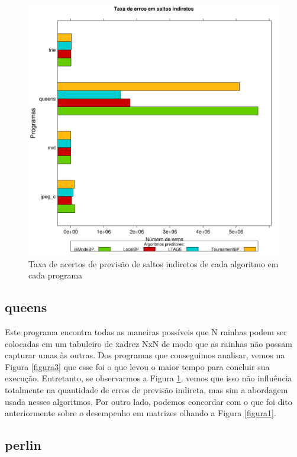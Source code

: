 \documentclass[12pt]{article}
\begin{document}
\begin{figure}[!htbp]
	
	\centering
	\includegraphics[scale=0.25]{Taxa_Miss_Indirect.png}
	\caption{Taxa de acertos de previsão de saltos indiretos de cada algoritmo em cada programa}
	\label{figura5}
	
\end{figure}

\subsection{queens}

Este programa encontra todas as maneiras possíveis que N rainhas podem ser colocadas em um tabuleiro de xadrez NxN de modo que as rainhas não possam capturar umas às outras. Dos programas que conseguimos analisar, vemos na Figura \ref{figura3} que esse foi o que levou o maior tempo para concluir sua execução. Entretanto, se observarmos a Figura \ref{figura5}, vemos que isso não influência totalmente na quantidade de erros de previsão indireta, mas sim a abordagem usada nesses algoritmos. Por outro lado, podemos concordar com o que foi dito anteriormente sobre o desempenho em matrizes olhando a Figura \ref{figura1}.

\subsection{perlin}
\end{document}
